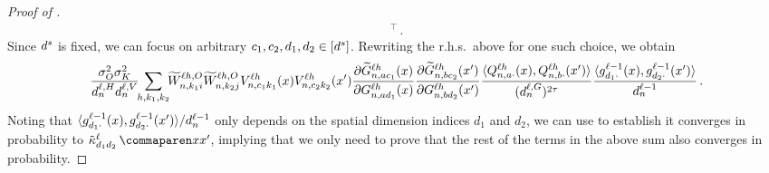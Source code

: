 \begin{proof}[Proof of ]
\begin{align*}
{            }^\top
        \, .
    \end{align*}
    Since $d^s$ is fixed, we can focus on arbitrary $c_1, c_2, d_1, d_2 \in [d^s]$.
    Rewriting the r.h.s.\ above for one such choice, we obtain
    \begin{align*}
        \frac{\sigma_{O}^2 \sigma_{K}^2}{d_{n}^{\ell, H} d_{n}^{\ell, V}}
        \! \!
        \sum_{h , k_1, k_2}
            \! \!
            \widetilde{W}_{n, k_1 i}^{\ell h, O}
            \widetilde{W}_{n, k_2 j}^{\ell h, O}
            V_{n, c_1 k_1}^{\ell h} (x)
            V_{n, c_2 k_2}^{\ell h} (x')
            \frac{
                \partial
                \widetilde{G}_{n, a c_1}^{\ell h} (x)
            }{
                \partial
                G_{n, a d_1}^{\ell h}(x)
            }
            \frac{
                \partial
                \widetilde{G}_{n, b c_2}^{\ell h} (x')
            }{
                \partial
                G_{n, b d_2}^{\ell h}(x')
            }
            \frac{
                \langle
                    Q_{n, a \cdot}^{\ell h} (x)
                    ,
                    Q_{n, b \cdot}^{\ell h} (x')
                \rangle
            }{
                (d_{n}^{\ell, G})^{2\tau}
            }
            \frac{
                \langle
                    {g}^{\ell - 1}_{d_1 \cdot}{(x)}
                    ,
                    {g}^{\ell - 1}_{d_2 \cdot}{(x')}
                \rangle
            }{
                d_{n}^{\ell - 1}
            }
        \, .
    \end{align*}
    Noting that 
    $
            \langle
                {g}^{\ell - 1}_{d_1 \cdot}{(x)}
                ,
                {g}^{\ell - 1}_{d_2 \cdot}{(x')}
            \rangle
        /
            d_{n}^{\ell - 1}
    $
    only depends on the spatial dimension indices $d_1$ and $d_2$, we can use  to establish it converges in probability to $\kerntildef{d_1 d_2}{\depthSymbol}{\inputSymbol}{\inputSymbol'}$, implying that we only need to prove that the rest of the terms in the above sum also converges in probability.

\end{proof}
